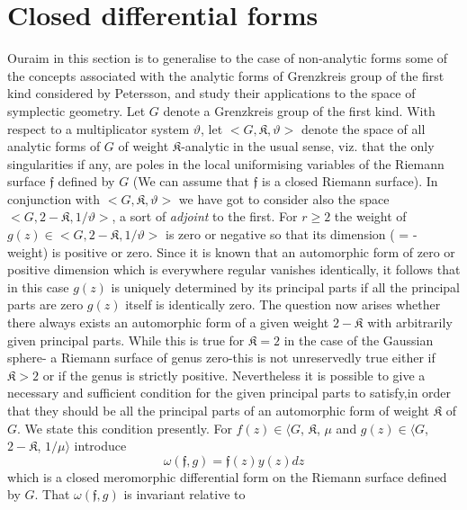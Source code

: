 
\chapter{Closed differential forms}%

Our\pageoriginale aim in this section is to generalise to the case of
non-analytic 
forms some of the concepts associated with the analytic forms of
Grenzkreis group of the first kind considered by Petersson, and study
their applications to the space of symplectic geometry. Let $G$ denote
a Grenzkreis group of the first kind. With respect to a multiplicator
system $\vartheta$, let $< G, \mathfrak{K}, \vartheta >$ denote the space of all
analytic forms of $G$ of weight $\mathfrak{K}$-analytic in the usual sense,
viz. that the only singularities if any, are poles in the local
uniformising variables of the Riemann surface $\mathfrak{f}$ defined
by $G$ (We can assume that $\mathfrak{f}$ is a closed Riemann
surface). In conjunction with $< G, \mathfrak{K}, \vartheta >$ we have got to
consider also the space $< G, 2 -\mathfrak{K}, 1/ \vartheta >$, a sort of
\textit{adjoint} to the first. For $r \ge 2$ the weight of $g (z) \in
< G, 2 - \mathfrak{K}, 1/ \vartheta >$ is zero or negative so that its
dimension 
( = - weight) is positive or zero. Since it is known that an
automorphic form of zero or positive dimension which is everywhere
regular vanishes identically, it follows that in this case $g(z)$ is
uniquely determined by its principal parts if all the principal parts
are zero $g(z)$ itself is identically zero. The question now arises
whether there always exists an automorphic form of a given weight $2 -
\mathfrak{K}$ with arbitrarily given principal parts. While this is
true for $\mathfrak{K} = 
2$ in the case of the Gaussian sphere- a Riemann surface of genus
zero-this is not unreservedly true either if $\mathfrak{K} > 2$ or if the genus
is strictly positive. Nevertheless it is possible to give a necessary
and sufficient condition for the given principal parts to
satisfy,\pageoriginale in order that they should be all the principal
parts of an automorphic form of weight $\mathfrak{K}$ of $G$. We state
this condition presently. For $f (z) \in \langle G$, $\mathfrak{K}$,
$\mu$ and $g (z) \in \langle G$, $2-\mathfrak{K}$, $1/ \mu \rangle$
introduce  
\begin{equation*}
\omega (\mathfrak{f}, g ) = \mathfrak{f} (z) y (z) dz \tag{310}\label{eq310}
\end{equation*}
which is a closed meromorphic differential form on the Riemann surface
defined by $G$. That $\omega (\mathfrak{f}, g)$ is invariant relative to
